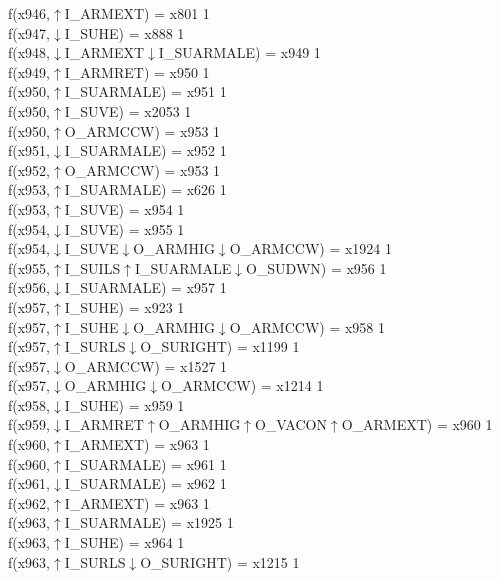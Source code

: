 f(x946,$\uparrow$I\_ARMEXT) = x801 {1} \\
f(x947,$\downarrow$I\_SUHE) = x888 {1} \\
f(x948,$\downarrow$I\_ARMEXT$\downarrow$I\_SUARMALE) = x949 {1} \\
f(x949,$\uparrow$I\_ARMRET) = x950 {1} \\
f(x950,$\uparrow$I\_SUARMALE) = x951 {1} \\
f(x950,$\uparrow$I\_SUVE) = x2053 {1} \\
f(x950,$\uparrow$O\_ARMCCW) = x953 {1} \\
f(x951,$\downarrow$I\_SUARMALE) = x952 {1} \\
f(x952,$\uparrow$O\_ARMCCW) = x953 {1} \\
f(x953,$\uparrow$I\_SUARMALE) = x626 {1} \\
f(x953,$\uparrow$I\_SUVE) = x954 {1} \\
f(x954,$\downarrow$I\_SUVE) = x955 {1} \\
f(x954,$\downarrow$I\_SUVE$\downarrow$O\_ARMHIG$\downarrow$O\_ARMCCW) = x1924 {1} \\
f(x955,$\uparrow$I\_SUILS$\uparrow$I\_SUARMALE$\downarrow$O\_SUDWN) = x956 {1} \\
f(x956,$\downarrow$I\_SUARMALE) = x957 {1} \\
f(x957,$\uparrow$I\_SUHE) = x923 {1} \\
f(x957,$\uparrow$I\_SUHE$\downarrow$O\_ARMHIG$\downarrow$O\_ARMCCW) = x958 {1} \\
f(x957,$\uparrow$I\_SURLS$\downarrow$O\_SURIGHT) = x1199 {1} \\
f(x957,$\downarrow$O\_ARMCCW) = x1527 {1} \\
f(x957,$\downarrow$O\_ARMHIG$\downarrow$O\_ARMCCW) = x1214 {1} \\
f(x958,$\downarrow$I\_SUHE) = x959 {1} \\
f(x959,$\downarrow$I\_ARMRET$\uparrow$O\_ARMHIG$\uparrow$O\_VACON$\uparrow$O\_ARMEXT) = x960 {1} \\
f(x960,$\uparrow$I\_ARMEXT) = x963 {1} \\
f(x960,$\uparrow$I\_SUARMALE) = x961 {1} \\
f(x961,$\downarrow$I\_SUARMALE) = x962 {1} \\
f(x962,$\uparrow$I\_ARMEXT) = x963 {1} \\
f(x963,$\uparrow$I\_SUARMALE) = x1925 {1} \\
f(x963,$\uparrow$I\_SUHE) = x964 {1} \\
f(x963,$\uparrow$I\_SURLS$\downarrow$O\_SURIGHT) = x1215 {1} \\
